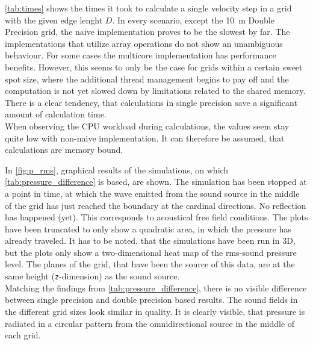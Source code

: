 \autoref{tab:times} shows the times it took to calculate a single velocity step in a grid with the given edge lenght \(D\). In every scenario, except the \SI{10}{\meter} Double Precision grid, the naive implementation proves to be the slowest by far. The implementations that utilize array operations do not show an unambiguous behaviour. For some cases the multicore implementation has performance benefits. However, this seems to only be the case for grids within a certain sweet spot size, where the additional thread management begins to pay off and the computation is not yet slowed down by limitations related to the shared memory.
There is a clear tendency, that calculations in single precision save a significant amount of calculation time.\\
When observing the CPU workload during calculations, the values seem stay quite low with non-naive implementation. It can therefore be assumed, that calculations are memory bound.

In \autoref{fig:p_rms}, graphical results of the simulations, on which \autoref{tab:pressure_difference} is based, are shown. The simulation has been stopped at a point in time, at which the wave emitted from the sound source in the middle of the grid has just reached the boundary at the cardinal directions. No reflection has happened (yet). This corresponds to acoustical free field conditions. The plots have been truncated to only show a quadratic area, in which the pressure has already traveled. It has to be noted, that the simulations have been run in 3D, but the plots only show a two-dimensional heat map of the \gls{rms}-sound pressure level. The planes of the grid, that have been the source of this data, are at the same height (\texttt{z}-dimension) as the sound source.\\
Matching the findings from \autoref{tab:pressure_difference}, there is no visible difference between single precision and double precision based results. The sound fields in the different grid sizes look similar in quality. It is clearly visible, that pressure is radiated in a circular pattern from the omnidirectional source in the middle of each grid.